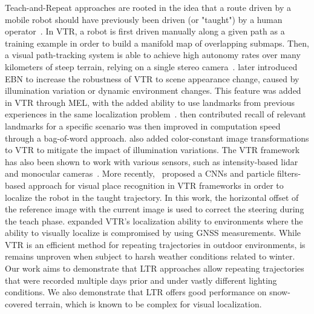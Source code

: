 Teach-and-Repeat approaches are rooted in the idea that a route driven by a mobile robot should have previously been driven (or "taught") by a human operator~\citep{Furgale2010}.
In \ac{VTR}, a robot is first driven manually along a given path as a training example in order to build a manifold map of overlapping submaps. 
Then, a visual path-tracking system is able to achieve high autonomy rates over many kilometers of steep terrain, relying on a single stereo camera~\citep{Furgale2010}. %
\citet{Churchill2013} later introduced \ac{EBN} to increase the robustness of \ac{VTR} to scene appearance change, caused by illumination variation or dynamic environment changes. 
This feature was added in \ac{VTR} through \ac{MEL}, with the added ability to use landmarks from previous experiences in the same localization problem~\citep{Paton2016}.
\citet{MacTavish2017} then contributed recall of relevant landmarks for a specific scenario was then improved in computation speed through a bag-of-word approach.
\citet{Paton2015} also added color-constant image transformations to \ac{VTR} to mitigate the impact of illumination variations. %
The \ac{VTR} framework has also been shown to work with various sensors, such as intensity-based lidar~\citep{McManus2013} and monocular cameras~\citep{Clement2017}.
More recently,~\citet{Camara2020} proposed a \acp{CNN} and particle filters-based approach for visual place recognition in \ac{VTR} frameworks in order to localize the robot in the taught trajectory.
In this work, the horizontal offset of the reference image with the current image is used to correct the steering during the teach phase.
\citet{Congram2021} expanded \ac{VTR}'s localization ability to environments where the ability to visually localize is compromised by using \ac{GNSS} measurements.
While \ac{VTR} is an efficient method for repeating trajectories in outdoor environments, is remains unproven when subject to harsh weather conditions related to winter.
Our work aims to demonstrate that \ac{LTR} approaches allow repeating trajectories that were recorded multiple days prior and under vastly different lighting conditions. %
We also demonstrate that \ac{LTR} offers good performance on snow-covered terrain, which is known to be complex for visual localization.


